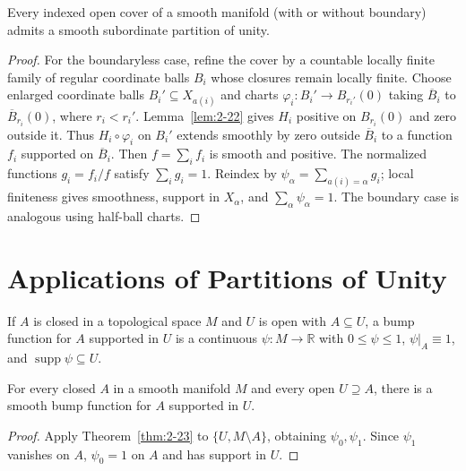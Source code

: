 \begin{theorem}
\label{thm:2-23}
\mathlibok
{}
Every indexed open cover of a smooth manifold (with or without boundary) admits a smooth subordinate partition of unity.
\end{theorem}

\begin{proof}
\sketch For the boundaryless case, refine the cover by a countable locally
finite family of regular coordinate balls $B_i$ whose closures remain locally
finite. Choose enlarged coordinate balls $B_i'\subseteq X_{a(i)}$ and charts
$\varphi_i:B_i'\to B_{r_i'}(0)$ taking $\overline B_i$ to
$\overline B_{r_i}(0)$, where $r_i<r_i'$. Lemma~\ref{lem:2-22} gives $H_i$ positive on
$B_{r_i}(0)$ and zero outside it. Thus $H_i\circ\varphi_i$ on $B_i'$ extends
smoothly by zero outside $\overline B_i$ to a function $f_i$ supported on
$\overline B_i$. Then $f=\sum_i f_i$ is smooth and positive. The normalized
functions $g_i=f_i/f$ satisfy $\sum_i g_i=1$. Reindex by
$\psi_\alpha=\sum_{a(i)=\alpha}g_i$; local finiteness gives smoothness,
support in $X_\alpha$, and $\sum_\alpha\psi_\alpha=1$. The boundary case is
analogous using half-ball charts.
\end{proof}


\section{Applications of Partitions of Unity}

\begin{definition}
\label{def:2-11-extra-1}
\mathlibok
If $A$ is closed in a topological space $M$ and $U$ is open with $A\subseteq U$, a bump function for $A$ supported in $U$ is a continuous $\psi:M\to\mathbb R$ with $0\leq\psi\leq1$, $\psi|_A\equiv1$, and $\operatorname{supp}\psi\subseteq U$.
\end{definition}

\begin{proposition}
\label{prop:2-25}

\leanok
{}
For every closed $A$ in a smooth manifold $M$ and every open $U\supseteq A$, there is a smooth bump function for $A$ supported in $U$.
\end{proposition}

\begin{proof}
\leanok
\sketch Apply Theorem~\ref{thm:2-23} to $\{U,M\setminus A\}$, obtaining $\psi_0,\psi_1$. Since $\psi_1$ vanishes on $A$, $\psi_0=1$ on $A$ and has support in $U$.
\end{proof}

